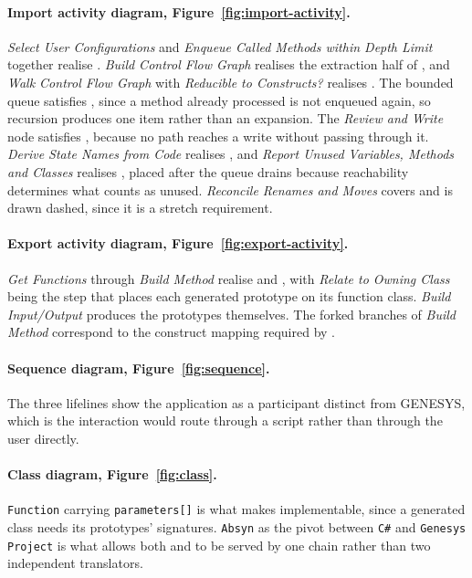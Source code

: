 \paragraph{Import activity diagram, Figure~\ref{fig:import-activity}.}
\emph{Select User Configurations} and \emph{Enqueue Called Methods within Depth
Limit} together realise . \emph{Build Control Flow Graph} realises the
extraction half of , and \emph{Walk Control Flow Graph} with
\emph{Reducible to Constructs?} realises . The bounded queue satisfies
, since a method already processed is not enqueued again, so recursion
produces one item rather than an expansion. The \emph{Review and Write} node
satisfies , because no path reaches a write without passing through
it. \emph{Derive State Names from Code} realises , and \emph{Report
Unused Variables, Methods and Classes} realises , placed after the
queue drains because reachability determines what counts as unused.
\emph{Reconcile Renames and Moves} covers  and is drawn dashed, since
it is a stretch requirement.

\paragraph{Export activity diagram, Figure~\ref{fig:export-activity}.}
\emph{Get Functions} through \emph{Build Method} realise  and
, with \emph{Relate to Owning Class} being the step that places each
generated prototype on its function class. \emph{Build Input/Output} produces the
prototypes themselves. The forked branches of \emph{Build Method} correspond to
the construct mapping required by .

\paragraph{Sequence diagram, Figure~\ref{fig:sequence}.}
The three lifelines show the application as a participant distinct from GENESYS,
which is the interaction  would route through a script rather than
through the user directly.

\paragraph{Class diagram, Figure~\ref{fig:class}.}
\texttt{Function} carrying \texttt{parameters[]} is what makes 
implementable, since a generated class needs its prototypes' signatures.
\texttt{Absyn} as the pivot between \texttt{C\#} and \texttt{Genesys Project}
is what allows both  and  to be served by one chain rather
than two independent translators.

